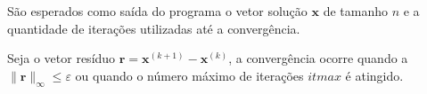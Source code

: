 São esperados como saída do programa o vetor solução $\mathbf{x}$ de tamanho $n$ e a quantidade de iterações utilizadas até a convergência.

Seja o vetor resíduo $\mathbf{r} = \mathbf{x}^{(k+1)} - \mathbf{x}^{(k)}$, a convergência ocorre quando a  $\| \mathbf{r} \|_{\infty} \leq \varepsilon$ ou quando o número máximo de iterações $itmax$ é atingido.
